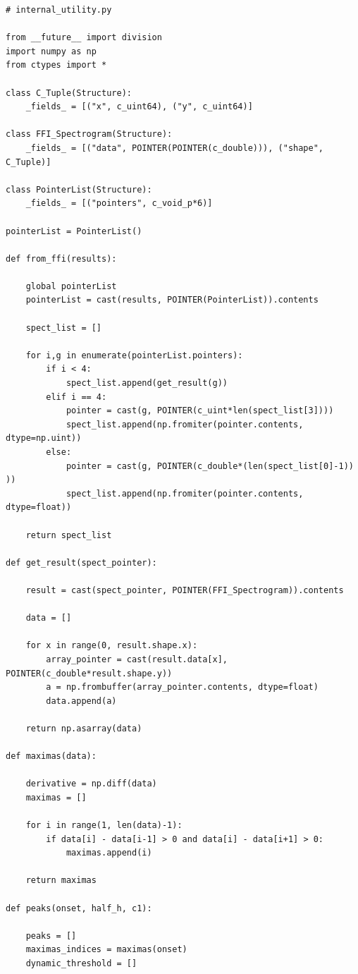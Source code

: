 \documentclass[a4paper,12pt]{report}
\begin{document}
\begin{verbatim}
# internal_utility.py

from __future__ import division
import numpy as np
from ctypes import *

class C_Tuple(Structure):
    _fields_ = [("x", c_uint64), ("y", c_uint64)]

class FFI_Spectrogram(Structure):
    _fields_ = [("data", POINTER(POINTER(c_double))), ("shape", C_Tuple)]

class PointerList(Structure):
    _fields_ = [("pointers", c_void_p*6)]

pointerList = PointerList()

def from_ffi(results):
    
    global pointerList
    pointerList = cast(results, POINTER(PointerList)).contents

    spect_list = []

    for i,g in enumerate(pointerList.pointers):
        if i < 4:
            spect_list.append(get_result(g))
        elif i == 4:
            pointer = cast(g, POINTER(c_uint*len(spect_list[3])))
            spect_list.append(np.fromiter(pointer.contents, dtype=np.uint))
        else:
            pointer = cast(g, POINTER(c_double*(len(spect_list[0]-1)) ))
            spect_list.append(np.fromiter(pointer.contents, dtype=float))
        
    return spect_list

def get_result(spect_pointer):

    result = cast(spect_pointer, POINTER(FFI_Spectrogram)).contents

    data = []

    for x in range(0, result.shape.x):
        array_pointer = cast(result.data[x], POINTER(c_double*result.shape.y))
        a = np.frombuffer(array_pointer.contents, dtype=float)
        data.append(a)
    
    return np.asarray(data)

def maximas(data):

    derivative = np.diff(data)
    maximas = []

    for i in range(1, len(data)-1):
        if data[i] - data[i-1] > 0 and data[i] - data[i+1] > 0:
            maximas.append(i)

    return maximas

def peaks(onset, half_h, c1):

    peaks = []
    maximas_indices = maximas(onset)
    dynamic_threshold = []


\end{verbatim}
\end{document}
